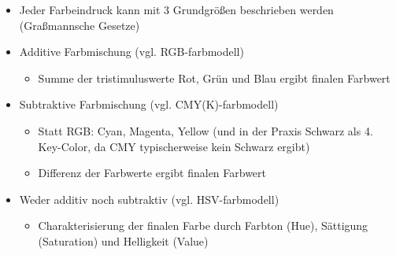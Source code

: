 \documentclass[10pt,a4paper]{article}
\begin{document}
	\begin{itemize}
		\item Jeder Farbeindruck kann mit 3 Grundgrößen beschrieben werden (Graßmannsche Gesetze)
		\item Additive Farbmischung (vgl. RGB-\Gls{farbmodell})
		\begin{itemize}
			\item Summe der \Gls{tristimuluswerte} Rot, Grün und Blau ergibt finalen Farbwert
		\end{itemize}
		\item Subtraktive Farbmischung (vgl. CMY(K)-\Gls{farbmodell})
		\begin{itemize}
			\item Statt RGB: Cyan, Magenta, Yellow (und in der Praxis Schwarz als 4. Key-Color, da CMY typischerweise kein Schwarz ergibt)
			\item Differenz der Farbwerte ergibt finalen Farbwert
		\end{itemize}
		\item Weder additiv noch subtraktiv (vgl. HSV-\Gls{farbmodell})
		\begin{itemize}
			\item Charakterisierung der finalen Farbe durch Farbton (Hue), Sättigung (Saturation) und Helligkeit (Value)
		\end{itemize}
	\end{itemize}

	\newpage
\end{document}
